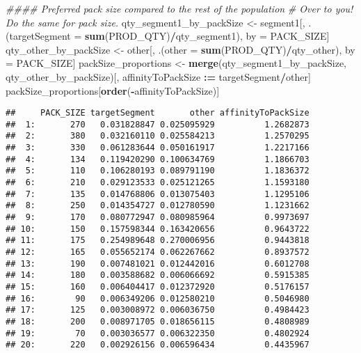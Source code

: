 \documentclass[]{article}
\newenvironment{Shaded}{\begin{snugshade}}{\end{snugshade}}
\newcommand{\CommentTok}[1]{\textcolor[rgb]{0.56,0.35,0.01}{\textit{#1}}}
\newcommand{\DataTypeTok}[1]{\textcolor[rgb]{0.13,0.29,0.53}{#1}}
\newcommand{\ErrorTok}[1]{\textcolor[rgb]{0.64,0.00,0.00}{\textbf{#1}}}
\newcommand{\KeywordTok}[1]{\textcolor[rgb]{0.13,0.29,0.53}{\textbf{#1}}}
\newcommand{\NormalTok}[1]{#1}
\newcommand{\OperatorTok}[1]{\textcolor[rgb]{0.81,0.36,0.00}{\textbf{#1}}}
\newcommand{\StringTok}[1]{\textcolor[rgb]{0.31,0.60,0.02}{#1}}
\begin{document}
\begin{Shaded}
\begin{Highlighting}[]
\CommentTok{#### Preferred pack size compared to the rest of the population}
\CommentTok{# Over to you! Do the same for pack size.}
\NormalTok{qty_segment1_by_packSize <-}\StringTok{ }\NormalTok{segment1[, .(}\DataTypeTok{targetSegment =} \KeywordTok{sum}\NormalTok{(PROD_QTY)}\OperatorTok{/}\NormalTok{qty_segment1),}
\NormalTok{                              by =}\StringTok{ }\NormalTok{PACK_SIZE]}
\NormalTok{qty_other_by_packSize <-}\StringTok{ }\NormalTok{other[, .(}\DataTypeTok{other =} \KeywordTok{sum}\NormalTok{(PROD_QTY)}\OperatorTok{/}\NormalTok{qty_other),}
\NormalTok{                         by =}\StringTok{ }\NormalTok{PACK_SIZE]}
\NormalTok{packSize_proportions <-}\StringTok{ }\KeywordTok{merge}\NormalTok{(qty_segment1_by_packSize, }
\NormalTok{                           qty_other_by_packSize)[, affinityToPackSize }\OperatorTok{:}\ErrorTok{=}\StringTok{ }\NormalTok{targetSegment}\OperatorTok{/}\NormalTok{other]}
\NormalTok{packSize_proportions[}\KeywordTok{order}\NormalTok{(}\OperatorTok{-}\NormalTok{affinityToPackSize)]}
\end{Highlighting}
\end{Shaded}

\begin{verbatim}
##     PACK_SIZE targetSegment       other affinityToPackSize
##  1:       270   0.031828847 0.025095929          1.2682873
##  2:       380   0.032160110 0.025584213          1.2570295
##  3:       330   0.061283644 0.050161917          1.2217166
##  4:       134   0.119420290 0.100634769          1.1866703
##  5:       110   0.106280193 0.089791190          1.1836372
##  6:       210   0.029123533 0.025121265          1.1593180
##  7:       135   0.014768806 0.013075403          1.1295106
##  8:       250   0.014354727 0.012780590          1.1231662
##  9:       170   0.080772947 0.080985964          0.9973697
## 10:       150   0.157598344 0.163420656          0.9643722
## 11:       175   0.254989648 0.270006956          0.9443818
## 12:       165   0.055652174 0.062267662          0.8937572
## 13:       190   0.007481021 0.012442016          0.6012708
## 14:       180   0.003588682 0.006066692          0.5915385
## 15:       160   0.006404417 0.012372920          0.5176157
## 16:        90   0.006349206 0.012580210          0.5046980
## 17:       125   0.003008972 0.006036750          0.4984423
## 18:       200   0.008971705 0.018656115          0.4808989
## 19:        70   0.003036577 0.006322350          0.4802924
## 20:       220   0.002926156 0.006596434          0.4435967
\end{verbatim}
\end{document}
